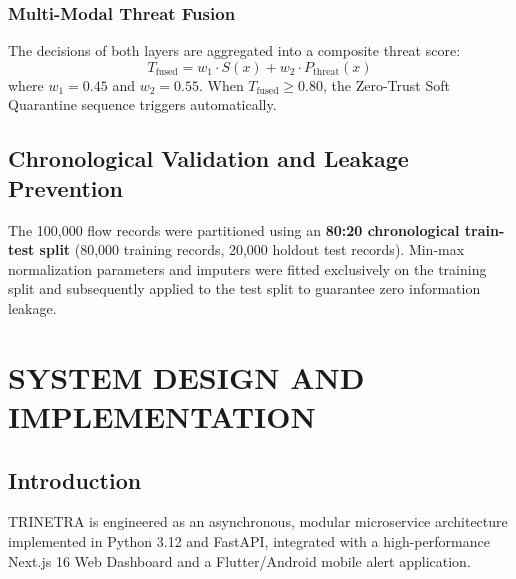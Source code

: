 \documentclass[12pt,a4paper]{report}
\begin{document}
\subsection{Multi-Modal Threat Fusion}
The decisions of both layers are aggregated into a composite threat score:
\begin{equation}
    T_{\text{fused}} = w_1 \cdot S(x) + w_2 \cdot P_{\text{threat}}(x)
\end{equation}
where $w_1 = 0.45$ and $w_2 = 0.55$. When $T_{\text{fused}} \ge 0.80$, the Zero-Trust Soft Quarantine sequence triggers automatically.

\section{Chronological Validation and Leakage Prevention}
The 100,000 flow records were partitioned using an \textbf{80:20 chronological train-test split} (80,000 training records, 20,000 holdout test records). Min-max normalization parameters and imputers were fitted exclusively on the training split and subsequently applied to the test split to guarantee zero information leakage.

\chapter{SYSTEM DESIGN AND IMPLEMENTATION}

\section{Introduction}
TRINETRA is engineered as an asynchronous, modular microservice architecture implemented in Python 3.12 and FastAPI, integrated with a high-performance Next.js 16 Web Dashboard and a Flutter/Android mobile alert application.
\end{document}
